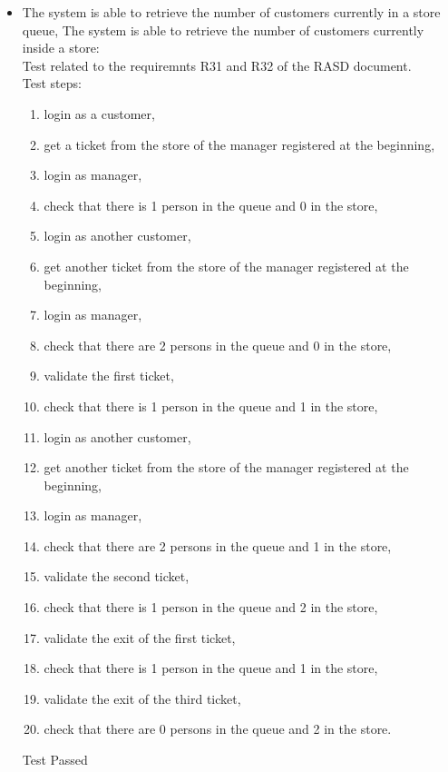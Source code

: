 \begin{itemize}

    \item The system is able to retrieve the number of customers currently in a store queue, The system is able to retrieve the number of customers currently inside a store: \\
    Test related to the requiremnts R31 and R32 of the RASD document. \\
    Test steps: \\
    \begin{enumerate}
        \item login as a customer,

        \item get a ticket from the store of the manager registered at the beginning,
        \item login as manager,
        \item check that there is 1 person in the queue and 0 in the store,
        \item login as another customer,
        \item get another ticket from the store of the manager registered at the beginning,
        \item login as manager,
        \item check that there are 2 persons in the queue and 0 in the store,
        \item validate the first ticket,
        \item check that there is 1 person in the queue and 1 in the store,
        \item login as another customer,
        \item get another ticket from the store of the manager registered at the beginning,
        \item login as manager,
        \item check that there are 2 persons in the queue and 1 in the store,
        \item validate the second ticket,
        \item check that there is 1 person in the queue and 2 in the store,
        \item validate the exit of the first ticket,
        \item check that there is 1 person in the queue and 1 in the store,
        \item validate the exit of the third ticket,
        \item check that there are 0 persons in the queue and 2 in the store.
    \end{enumerate}
    Test Passed \\


\end{itemize}
